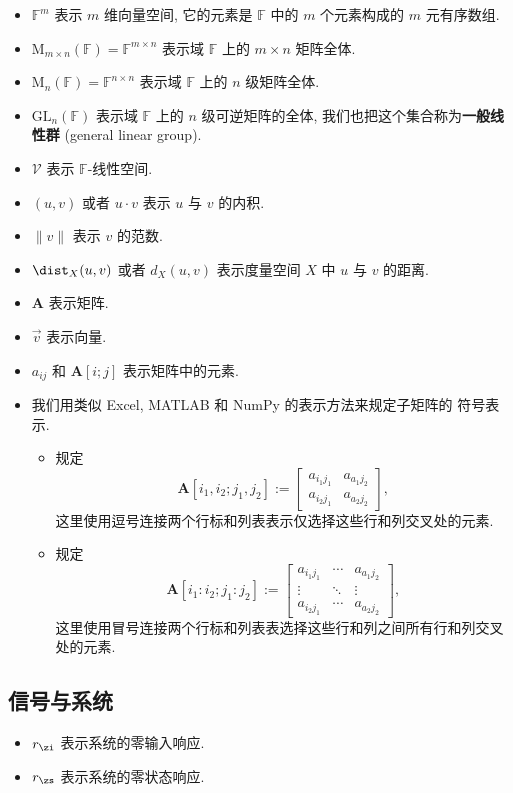 \begin{itemize}
    \item $\mathbb{F}^m$ 表示 $m$ 维向量空间, 它的元素是 $\mathbb{F}$ 中的 
    $m$ 个元素构成的 $m$ 元有序数组.
    \item $\mathrm{M}_{m \times n}(\mathbb{F}) = \mathbb{F}^{m \times n}$
    表示域 $\mathbb{F}$ 上的 $m \times n$ 矩阵全体.
    \item $\mathrm{M}_n(\mathbb{F}) = \mathbb{F}^{n \times n}$ 
    表示域 $\mathbb{F}$ 上的 $n$ 级矩阵全体.
    \item $\mathrm{GL}_n(\mathbb{F})$ 表示域 $\mathbb{F}$ 上的 $n$ 级可逆矩阵的全体,
    我们也把这个集合称为{\bfseries 一般线性群} (general linear group).
    \item $\mathcal{V}$ 表示 $\mathbb{F}$-线性空间.
    \item $(u, v)$ 或者 $u \cdot v$ 表示 $u$ 与 $v$ 的内积.
    \item $\|v\|$ 表示 $v$ 的范数.
    \item $\dist_X(u, v)$ 或者 $d_X(u, v)$ 
    表示度量空间 $X$ 中 $u$ 与 $v$ 的距离.
    \item $\mathbf{A}$ 表示矩阵.
    \item $\vec{v}$ 表示向量.
    \item $a_{ij}$ 和 $\mathbf{A}[i; j]$ 表示矩阵中的元素.
    \item 我们用类似 Excel, MATLAB 和 NumPy 的表示方法来规定子矩阵的
    符号表示. 
    \begin{itemize}
        \item 规定
        \[ \mathbf{A}[i_1, i_2; j_1, j_2] := \begin{bmatrix}
            a_{i_1j_1} & a_{a_1j_2} \\ 
            a_{i_2j_1} & a_{a_2j_2}
        \end{bmatrix}, \]
        这里使用逗号连接两个行标和列表表示仅选择这些行和列交叉处的元素.
        \item 规定 \[ \mathbf{A}[i_1:i_2; j_1: j_2]
        := \begin{bmatrix}
            a_{i_1j_1} & \cdots & a_{a_1j_2} \\ 
            \vdots & \ddots & \vdots \\ 
            a_{i_2j_1} & \cdots & a_{a_2j_2}
        \end{bmatrix}, \]
        这里使用冒号连接两个行标和列表表选择这些行和列之间所有行和列交叉处的元素.
    \end{itemize} 
\end{itemize}

\subsection*{信号与系统}



\begin{itemize}
    \item $r_\zi$ 表示系统的零输入响应.
    \item $r_\zs$ 表示系统的零状态响应.
\end{itemize}
